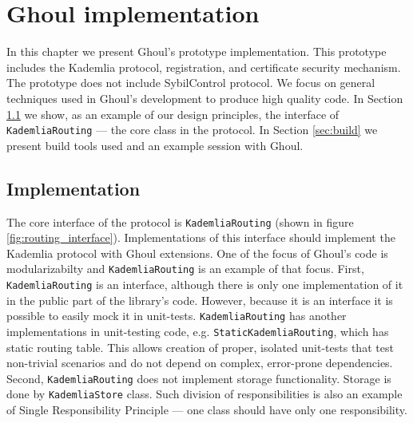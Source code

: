 \chapter{Ghoul implementation}
\label{ch:implementation}
In this chapter we present Ghoul's prototype implementation.
This prototype includes the Kademlia protocol, registration, and certificate
security mechanism.
The prototype does not include SybilControl protocol.
We focus on general techniques used in Ghoul's development to produce high
quality code.
In Section \ref{sec:implementation} we show, as an example of our design
principles, the interface of \texttt{KademliaRouting} --- the core class in the
protocol.
In Section \ref{sec:build} we present build tools used and an example session
with Ghoul.

\section{Implementation}
\label{sec:implementation}

The core interface of the protocol is \texttt{KademliaRouting} (shown in figure
\ref{fig:routing_interface}).
Implementations of this interface should implement the Kademlia protocol with
Ghoul extensions.
One of the focus of Ghoul's code is modularizabilty and \texttt{KademliaRouting}
is an example of that focus.
First, \texttt{KademliaRouting} is an interface, although there is only one
implementation of it in the public part of the library's code.
However, because it is an interface it is possible to easily mock it in
unit-tests.
\texttt{KademliaRouting} has another implementations in unit-testing code, e.g.
\texttt{StaticKademliaRouting}, which has static routing table.
This allows creation of proper, isolated unit-tests that test non-trivial
scenarios and do not depend on complex, error-prone dependencies.
Second, \texttt{KademliaRouting} does not implement storage functionality.
Storage is done by \texttt{KademliaStore} class.
Such division of responsibilities is also an example of Single Responsibility
Principle --- one class should have only one responsibility.

